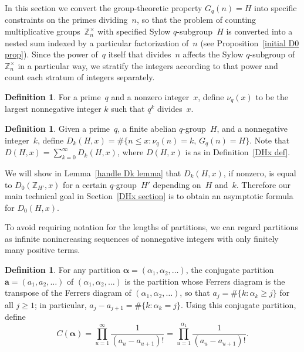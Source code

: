 \documentclass[12pt,reqno]{amsart}
\theoremstyle{definition}
\newtheorem{definition}[theorem]{Definition}
\newcommand{\Z}{{\mathbb Z}}
\newcommand{\ba}{{\bm a}}
\newcommand{\balpha}{{\bm\alpha}}
\begin{document}
In this section we convert the group-theoretic property $G_q(n)=H$ into specific constraints on the primes dividing~$n$, so that the problem of counting multiplicative groups~$\Z_n^\times$ with specified Sylow $q$-subgroup~$H$ is converted into a nested sum indexed by a particular factorization of~$n$ (see Proposition~\ref{initial D0 prop}). Since the power of~$q$ itself that divides~$n$ affects the Sylow $q$-subgroup of $\Z_n^\times$ in a particular way, we stratify the integers according to that power and count each stratum of integers separately.

\begin{definition}
For a prime~$q$ and a nonzero integer~$x$, define $\nu_q(x)$ to be the largest nonnegative integer $k$ such that $q^k$ divides~$x$.
\end{definition}

\begin{definition} \label{DkHx def}
Given a prime~$q$, a finite abelian $q$-group~$H$, and a nonnegative integer~$k$, define $D_k(H,x)=\#\{n\le x \colon \nu_q(n)=k,\, G_q(n)=H\}$. Note that $D(H,x) = \sum_{k=0}^\infty D_k(H,x)$, where $D(H,x)$ is as in Definition~\ref{DHx def}.
\end{definition}

\noindent
We will show in Lemma~\ref{handle Dk lemma} that $D_k(H,x)$, if nonzero, is equal to $D_0(\Z_{H'},x)$ for a certain $q$-group~$H'$ depending on~$H$ and~$k$. Therefore our main technical goal in Section~\ref{DHx section} is to obtain an asymptotic formula for $D_0(H,x)$.

To avoid requiring notation for the lengths of partitions, we can regard partitions as infinite nonincreasing sequences of nonnegative integers with only finitely many positive terms.

\begin{definition} \label{partition def}
For any partition $\balpha = (\alpha_1,\alpha_2,\ldots)$, the conjugate partition $\ba = (a_1,a_2,\ldots)$ of $(\alpha_1,\alpha_2,\ldots)$ is the partition whose Ferrers diagram is the transpose of the Ferrers diagram of $(\alpha_1,\alpha_2,\ldots)$, so that $a_j=\#\{k\colon \alpha_k\ge j\}$ for all $j\ge1$; in particular, $a_j-a_{j+1} = \#\{k\colon \alpha_k=j\}$. Using this conjugate partition, define
\begin{equation} \label{Calpha def}
C(\balpha) = \prod_{u=1}^\infty \frac1{(a_u-a_{u+1})!} = \prod_{u=1}^{\alpha_1} \frac1{(a_u-a_{u+1})!}.
\end{equation}
\end{definition}
\end{document}
